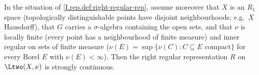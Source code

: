 In the situation of \cref{I.rep.def:right-regular-rep}, assume moreover that $X$ is an $R_1$ space (topologically
distinguishable points have disjoint neighbourhoods; e.g.\ $X$ Hausdorff), that $G$ carries a $\sigma$-algebra
containing the open sets, and that $\nu$ is locally finite (every point has a neighbourhood of finite measure) and
inner regular on sets of finite measure ($\nu(E)=\sup\{\nu(C):C\subseteq E\text{ compact}\}$ for every Borel $E$ with
$\nu(E)<\infty$). Then the right regular representation $R$ on $\Ltwo(X,\nu)$ is strongly continuous.

